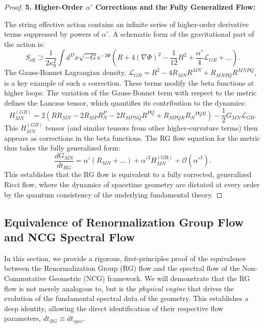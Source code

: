 \documentclass[11pt, letterpaper]{report}
\theoremstyle{plain} %
\theoremstyle{definition} %
\theoremstyle{remark} %
\begin{document}
\begin{proof}
\textbf{5. Higher-Order $\alpha'$ Corrections and the Fully Generalized Flow:}

The string effective action contains an infinite series of higher-order derivative terms suppressed by powers of $\alpha'$. A schematic form of the gravitational part of the action is:
\begin{equation}
    S_{\text{eff}} \supset \frac{1}{2\kappa_0^2} \int d^D x \sqrt{-G} e^{-2\Phi} \left( R + 4(\nabla\Phi)^2 - \frac{1}{12}H^2 + \frac{\alpha'}{4} \mathcal{L}_{GB} + \dots \right).
    \label{eq:alpha_corrected_action_final}
\end{equation}
The Gauss-Bonnet Lagrangian density, $\mathcal{L}_{GB} = R^2 - 4R_{MN}R^{MN} + R_{MNPQ}R^{MNPQ}$, is a key example of such a correction. These terms modify the beta functions at higher loops. The variation of the Gauss-Bonnet term with respect to the metric defines the Lanczos tensor, which quantifies its contribution to the dynamics:
\begin{equation}
\label{eq:lanczos_tensor_full}
    H_{MN}^{(GB)} = 2\left(R R_{MN} - 2 R_{MP}R^{P}_{N} - 2 R_{MPNQ}R^{PQ} + R_{MPQR}R_{N}{}^{PQR}\right) - \frac{1}{2} G_{MN}\mathcal{L}_{GB}.
\end{equation}
This $H_{MN}^{(GB)}$ tensor (and similar tensors from other higher-curvature terms) then appears as corrections in the beta functions. The RG flow equation for the metric thus takes the fully generalized form:
\begin{equation}
    \frac{dG_{MN}}{dt_{RG}} = \alpha' \left(R_{MN} + \dots\right) + \alpha'^2 H_{MN}^{(\text{GB})} + \mathcal{O}(\alpha'^3).
\end{equation}
This establishes that the RG flow is equivalent to a fully corrected, generalized Ricci flow, where the dynamics of spacetime geometry are dictated at every order by the quantum consistency of the underlying fundamental theory.
\end{proof}







\subsection{Equivalence of Renormalization Group Flow and NCG Spectral Flow}
\label{subsec:rg_ncg_spectral_flow}

In this section, we provide a rigorous, first-principles proof of the equivalence between the Renormalization Group (RG) flow and the spectral flow of the Non-Commutative Geometric (NCG) framework. We will demonstrate that the RG flow is not merely analogous to, but is the \textit{physical engine} that drives the evolution of the fundamental spectral data of the geometry. This establishes a deep identity, allowing the direct identification of their respective flow parameters, $dt_{RG} \equiv dt_{spec}$.
\end{document}
